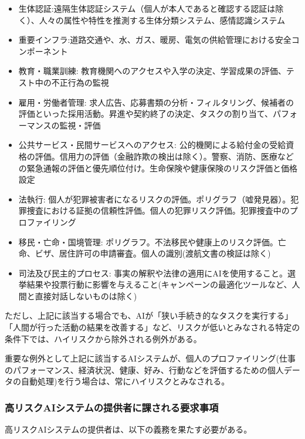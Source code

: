 \begin{itemize}
    \item 生体認証:遠隔生体認証システム（個人が本人であると確認する認証は除く）、人々の属性や特性を推測する生体分類システム、感情認識システム
    \item 重要インフラ:道路交通や、水、ガス、暖房、電気の供給管理における安全コンポーネント
    \item 教育・職業訓練: 教育機関へのアクセスや入学の決定、学習成果の評価、テスト中の不正行為の監視
    \item 雇用・労働者管理: 求人広告、応募書類の分析・フィルタリング、候補者の評価といった採用活動。昇進や契約終了の決定、タスクの割り当て、パフォーマンスの監視・評価
    \item 公共サービス・民間サービスへのアクセス: 公的機関による給付金の受給資格の評価。信用力の評価（金融詐欺の検出は除く）。警察、消防、医療などの緊急通報の評価と優先順位付け。生命保険や健康保険のリスク評価と価格設定
    \item 法執行: 個人が犯罪被害者になるリスクの評価。ポリグラフ（嘘発見器）。犯罪捜査における証拠の信頼性評価。個人の犯罪リスク評価。犯罪捜査中のプロファイリング
    \item 移民・亡命・国境管理: ポリグラフ。不法移民や健康上のリスク評価。亡命、ビザ、居住許可の申請審査。個人の識別(渡航文書の検証は除く)
    \item 司法及び民主的プロセス: 事実の解釈や法律の適用にAIを使用すること。選挙結果や投票行動に影響を与えること(キャンペーンの最適化ツールなど、人間と直接対話しないものは除く)
\end{itemize}

ただし、上記に該当する場合でも、AIが「狭い手続き的なタスクを実行する」「人間が行った活動の結果を改善する」など、リスクが低いとみなされる特定の条件下では、ハイリスクから除外される例外がある。

重要な例外として上記に該当するAIシステムが、個人のプロファイリング(仕事のパフォーマンス、経済状況、健康、好み、行動などを評価するための個人データの自動処理)を行う場合は、常にハイリスクとみなされる。

\subsubsection{高リスクAIシステムの提供者に課される要求事項}

高リスクAIシステムの提供者は、以下の義務を果たす必要がある。


